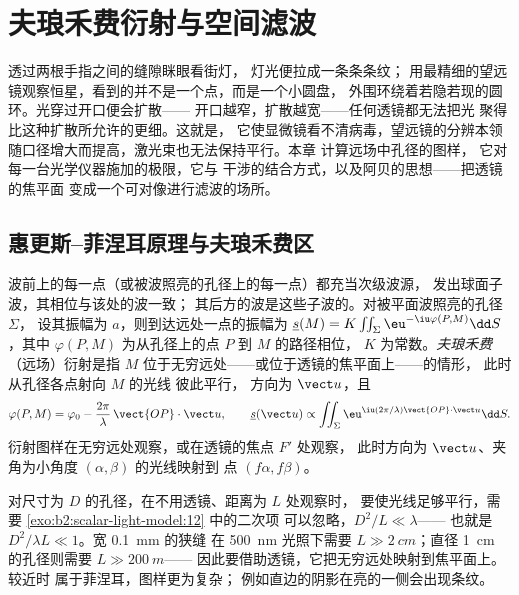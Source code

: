 \chapter{夫琅禾费衍射与空间滤波}\label{ch:b2:diffraction}

透过两根手指之间的缝隙眯眼看街灯，
灯光便拉成一条条条纹；
用最精细的望远镜观察恒星，看到的并不是一个点，而是一个小圆盘，
外围环绕着若隐若现的圆环。光穿过开口便会扩散——
开口越窄，扩散越宽——任何透镜都无法把光
聚得比这种扩散所允许的更细。这就是\emph{}，
它使显微镜看不清病毒，望远镜的分辨本领
随口径增大而提高，激光束也无法保持平行。本章
计算远场中孔径的图样，
它对每一台光学仪器施加的极限，它与
干涉的结合方式，以及阿贝的思想——把透镜的焦平面
变成一个可对像进行滤波的场所。

\section{惠更斯–菲涅耳原理与夫琅禾费区}

\begin{definition}\label{def:b2:diffraction:huygens}
波前上的每一点（或被波照亮的孔径上的每一点）都充当次级波源，
发出球面子波，其相位与该处的波一致；
其后方的波是这些子波的。对被平面波照亮的孔径 $\Sigma$，
设其振幅为 $a$，则到达远处一点的振幅为
$\underline s(M) = K\iint_\Sigma\eu^{-\iu\varphi(P, M)}\dd S$，其中
$\varphi(P, M)$ 为从孔径上的点 $P$ 到 $M$ 的路径相位，
$K$ 为常数。\emph{夫琅禾费}（远场）衍射是指 $M$ 位于无穷远处——或位于透镜的焦平面上——的情形，
此时从孔径各点射向 $M$ 的光线
彼此平行，
方向为 $\vect u$，且
\[
\varphi(P, M) = \varphi_0 - \frac{2\pi}\lambda\,\vect{OP}\cdot\vect u , \qquad
\underline s(\vect u) \propto \iint_\Sigma\eu^{\iu(2\pi/\lambda)\vect{OP}\cdot\vect u}\dd S .
\]
衍射图样在无穷远处观察，或在透镜的焦点 $F'$ 处观察，
此时方向为 $\vect u$、夹角为小角度 $(\alpha, \beta)$ 的光线映射到
点 $(f\alpha, f\beta)$。
\end{definition}
\admitted

\begin{remark}[距离多远才算足够远？]\label{rem:b2:diffraction:fresnelnumber}
对尺寸为 $D$ 的孔径，在不用透镜、距离为 $L$ 处观察时，
要使光线足够平行，需要 \cref{exo:b2:scalar-light-model:12} 中的二次项
可以忽略，$D^2/L \ll \lambda$——
也就是\emph{} $D^2/\lambda L \ll 1$。宽 \qty{0.1}{mm} 的狭缝
在 \qty{500}{nm} 光照下需要 $L \gg \qty{2}{cm}$；直径 \qty{1}{cm} 的孔径则需要 $L \gg \qty{200}{m}$——
因此要借助透镜，它把无穷远处映射到焦平面上。较近时
属于菲涅耳，图样更为复杂；
例如直边的阴影在亮的一侧会出现条纹。
\end{remark}

